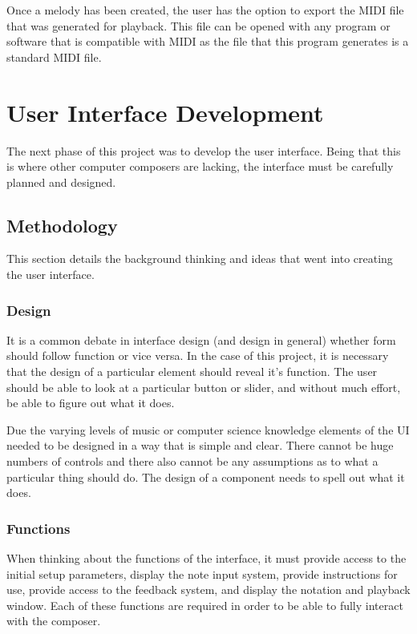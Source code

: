 Once a melody has been created, the user has the option to export the MIDI file that was generated for playback.  This file can be opened with any program or software that is compatible with MIDI as the file that this program generates is a standard MIDI file.

\section{User Interface Development}
\label{sec:userinterfacedevelopment}

The next phase of this project was to develop the user interface.  Being that this is where other computer composers are lacking, the interface must be carefully planned and designed.

\subsection{Methodology}
\label{subsec:methodology}

This section details the background thinking and ideas that went into creating the user interface.

\subsubsection{Design}
\label{subsubsec:methodologydesign}

It is a common debate in interface design (and design in general) whether form should follow function or vice versa.  In the case of this project, it is necessary that the design of a particular element should reveal it's function.  The user should be able to look at a particular button or slider, and without much effort, be able to figure out what it does.

\vspace{\baselineskip}

Due the varying levels of music or computer science knowledge elements of the UI needed to be designed in a way that is simple and clear.  There cannot be huge numbers of controls and there also cannot be any assumptions as to what a particular thing should do.  The design of a component needs to spell out what it does.

\subsubsection{Functions}
\label{subsubsec:methodologyfunctions}

When thinking about the functions of the interface, it must provide access to the initial setup parameters, display the note input system, provide instructions for use, provide access to the feedback system, and display the notation and playback window.  Each of these functions are required in order to be able to fully interact with the composer.

